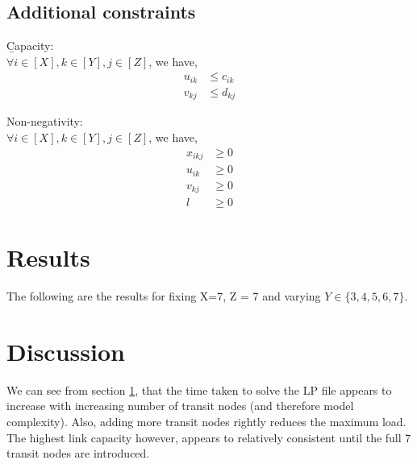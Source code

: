 \documentclass[12pt,twoside]{article}
\begin{document}
\subsection{Additional constraints}\label{Sec: Const} 
\b{Capacity}:\\
$\forall i \in [X], k \in [Y], j \in [Z]$, we have,
\begin{align}
	u_{ik} &\leq c_{ik} \\
	v_{kj} &\leq d_{kj}  
\end{align}


Non-negativity:\\
$\forall i \in [X], k \in [Y], j \in [Z]$, we have,
\begin{align}
	x_{ikj} &\geq 0\\
	u_{ik} &\geq 0\\
	v_{kj} &\geq 0\\
	l &\geq 0 \label{last}
\end{align}

\section{Results}\label{results}
The following are the results for fixing X=7, Z = 7 and varying $Y \in {\{3,4,5,6,7\}}$.\\
\begin{center}
\end{center}

\section{Discussion}
We can see from section \ref{results}, that the time taken to solve the LP file appears to increase with increasing number of transit nodes (and therefore model complexity). Also, adding more transit nodes rightly reduces the maximum load. The highest link capacity however, appears to relatively consistent until the full 7 transit nodes are introduced.











\end{document}
